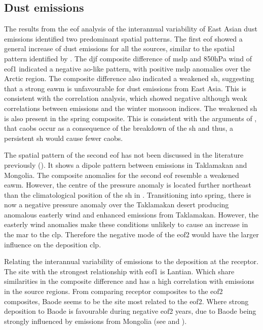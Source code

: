 \subsection{Dust emissions}
The results from the \acrshort{eof} analysis of the interannual variability of East Asian dust emissions identified two predominant spatial patterns. The first \acrshort{eof} showed a general increase of dust emissions for all the sources, similar to the spatial pattern identified by \textcite{liu2018influence,liu2020impact}.  
The \acrshort{djf} composite difference of \acrshort{mslp} and 850hPa wind of \acrshort{eof}1 indicated a negative \acrshort{ao}-like pattern, with positive \acrshort{mslp} anomalies over the Arctic region. 
The composite difference also indicated a weakened \acrshort{sh}, suggesting that a strong \acrshort{eawm} is unfavourable for dust emissions from East Asia. 
This is consistent with the correlation analysis, which showed negative although weak correlations between emissions and the winter monsoon indices. 
The weakened \acrshort{sh} is also present in the spring composite. 
This is consistent with the arguments of \textcite{roe2009interpretation}, that \acrshort{caob}s occur as a consequence of the breakdown of the \acrshort{sh} and thus, a persistent \acrshort{sh} would cause fewer \acrshort{caob}s.

The spatial pattern of the second \acrshort{eof} has not been discussed in the literature previously (). It shows a dipole pattern between emissions in Taklamakan and Mongolia. 
The composite anomalies for the second \acrshort{eof} resemble a weakened \acrshort{eawm}. However, the centre of the pressure anomaly is located further northeast than the climatological position of the \acrshort{sh} in . 
Transitioning into spring, there is now a negative pressure anomaly over the Taklamakan desert producing anomalous easterly wind and enhanced emissions from Taklamakan. However, the easterly wind anomalies make these conditions unlikely to cause an increase in the \acrshort{mar} to the \acrshort{clp}. Therefore the negative mode of the \acrshort{eof}2 would have the larger influence on the deposition \acrshort{clp}. 

Relating the interannual variability of emissions to the deposition at the receptor. The site with the strongest relationship with \acrshort{eof}1 is Lantian.
Which share similarities in the composite difference and has a high correlation with emissions in the source regions. 
From comparing receptor composites to the \acrshort{eof}2 composites, Baode seems to be the site most related to the \acrshort{eof}2. Where strong deposition to Baode is favourable during negative \acrshort{eof}2 years, due to Baode being strongly influenced by emissions from Mongolia (see  and ).   

